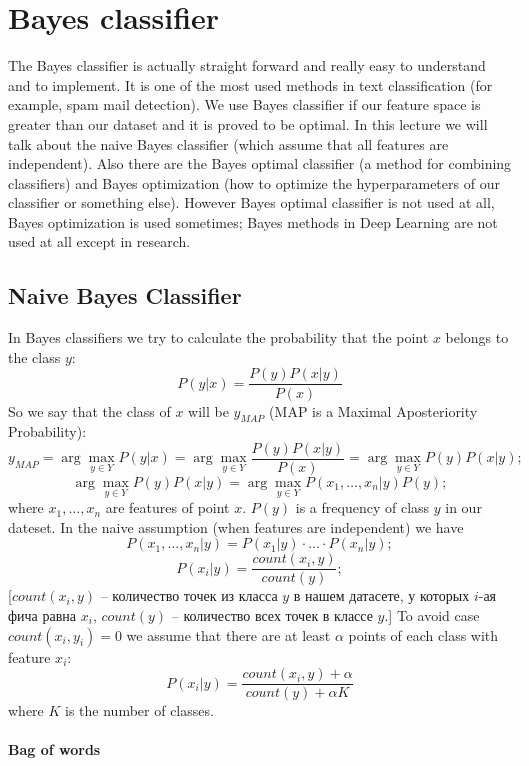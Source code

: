 \chapter{Bayes classifier}

{\sf The Bayes classifier is actually straight forward and really easy to understand and to implement. It is one of the most used methods in text classification (for example, spam mail detection). We use Bayes classifier if our feature space is greater than our dataset and it is proved to be optimal. In this lecture we will talk about the naive Bayes classifier (which assume that all features are independent). Also there are the Bayes optimal classifier (a method for combining classifiers) and Bayes optimization (how to optimize the hyperparameters of our classifier or something else). However Bayes optimal classifier is not used at all, Bayes optimization is used sometimes; Bayes methods in Deep Learning are not used at all except in research.}

\section{Naive Bayes Classifier}

In Bayes classifiers we try to calculate the probability that the point $x$ belongs to the class $y$:
$$P(y|x)=\frac{P(y)P(x|y)}{P(x)}$$
So we say that the class of $x$ will be $y_{MAP}$ (MAP is a Maximal Aposteriority Probability):
$$y_{MAP}=\arg\max\limits_{y\in Y} P(y|x)=\arg\max\limits_{y\in Y}\frac{P(y)P(x|y)}{P(x)}=\arg\max\limits_{y\in Y} P(y)P(x|y);$$
$$\arg\max\limits_{y\in Y} P(y)P(x|y)=\arg\max\limits_{y\in Y} P(x_1,\ldots,x_n|y)P(y);$$
where $x_1,\ldots,x_n$ are features of point $x$. $P(y)$ is a frequency of class $y$ in our dateset. In the naive assumption (when features are independent) we have
$$P(x_1,\ldots,x_n|y)=P(x_1|y)\cdot\ldots\cdot P(x_n|y);$$
$$P(x_i|y)=\frac{count(x_i,y)}{count(y)};$$
[$count(x_i, y)$ -- количество точек из класса $y$ в нашем датасете, у которых $i$-ая фича равна $x_i$, $count(y)$ -- количество всех точек в классе $y$.] To avoid case $count(x_i,y_i)=0$ we assume that there are at least $\alpha$ points of each class with feature $x_i$:
$$P (x_i|y)=\frac{count(x_i,y)+\alpha}{count(y)+\alpha K}$$
where $K$ is the number of classes.

\subsubsection*{Bag of words}

